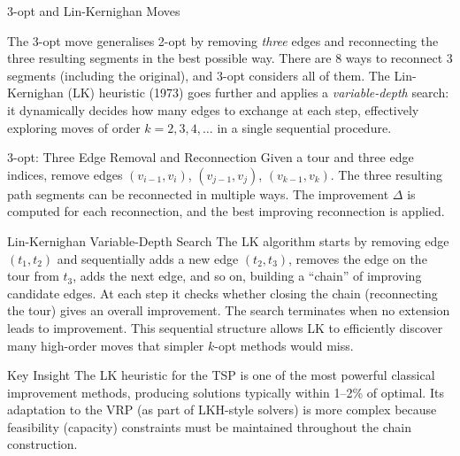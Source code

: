 \documentclass[aspectratio=169,10pt]{beamer}
\begin{document}
\begin{frame}[allowframebreaks]{3-opt and Lin-Kernighan Moves}

  The 3-opt move generalises 2-opt by removing \emph{three} edges and
  reconnecting the three resulting segments in the best possible way.
  There are 8 ways to reconnect 3 segments (including the original),
  and 3-opt considers all of them.  The Lin-Kernighan (LK) heuristic
  (1973) goes further and applies a \emph{variable-depth} search: it
  dynamically decides how many edges to exchange at each step,
  effectively exploring moves of order $k = 2, 3, 4, \ldots$ in a
  single sequential procedure.

  \begin{block}{3-opt: Three Edge Removal and Reconnection}
    Given a tour and three edge indices, remove edges
    $(v_{i-1}, v_i)$, $(v_{j-1}, v_j)$, $(v_{k-1}, v_k)$.
    The three resulting path segments can be reconnected in multiple
    ways.  The improvement $\Delta$ is computed for each reconnection,
    and the best improving reconnection is applied.
  \end{block}

  \begin{block}{Lin-Kernighan Variable-Depth Search}
    The LK algorithm starts by removing edge $(t_1, t_2)$ and
    sequentially adds a new edge $(t_2, t_3)$, removes the edge on
    the tour from $t_3$, adds the next edge, and so on, building a
    ``chain'' of improving candidate edges.  At each step it checks
    whether closing the chain (reconnecting the tour) gives an overall
    improvement.  The search terminates when no extension leads to
    improvement.  This sequential structure allows LK to efficiently
    discover many high-order moves that simpler $k$-opt methods would miss.
  \end{block}

  \begin{alertblock}{Key Insight}
    The LK heuristic for the TSP is one of the most powerful classical
    improvement methods, producing solutions typically within 1--2\% of
    optimal.  Its adaptation to the VRP (as part of LKH-style solvers)
    is more complex because feasibility (capacity) constraints must be
    maintained throughout the chain construction.
  \end{alertblock}

\end{frame}
\end{document}
